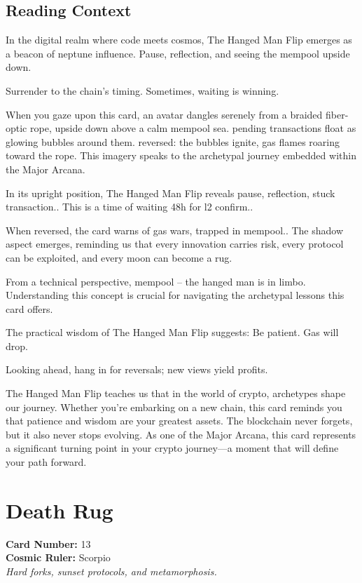 \documentclass[11pt,oneside]{book}
\begin{document}
\begin{minipage}[t]{0.55\textwidth}
  \subsection*{Reading Context}
  In the digital realm where code meets cosmos, The Hanged Man Flip emerges as a beacon of neptune influence. Pause, reflection, and seeing the mempool upside down.

  Surrender to the chain's timing. Sometimes, waiting is winning.

  When you gaze upon this card, an avatar dangles serenely from a braided fiber-optic rope, upside down above a calm mempool sea. pending transactions float as glowing bubbles around them. reversed: the bubbles ignite, gas flames roaring toward the rope. This imagery speaks to the archetypal journey embedded within the Major Arcana.

  In its upright position, The Hanged Man Flip reveals pause, reflection, stuck transaction.. This is a time of waiting 48h for l2 confirm..

  When reversed, the card warns of gas wars, trapped in mempool.. The shadow aspect emerges, reminding us that every innovation carries risk, every protocol can be exploited, and every moon can become a rug.

  From a technical perspective, mempool – the hanged man is in limbo. Understanding this concept is crucial for navigating the archetypal lessons this card offers.

  The practical wisdom of The Hanged Man Flip suggests: Be patient. Gas will drop.

  Looking ahead, hang in for reversals; new views yield profits.

  The Hanged Man Flip teaches us that in the world of crypto, archetypes shape our journey. Whether you're embarking on a new chain, this card reminds you that patience and wisdom are your greatest assets. The blockchain never forgets, but it also never stops evolving. As one of the Major Arcana, this card represents a significant turning point in your crypto journey—a moment that will define your path forward.

\end{minipage}

\newpage
\section*{Death Rug}

\begin{minipage}[t]{0.55\textwidth}
  \vspace{0pt}
  \textbf{Card Number:} 13\\  \textbf{Cosmic Ruler:} Scorpio\\  \textit{Hard forks, sunset protocols, and metamorphosis.}
\end{minipage}
\end{document}
